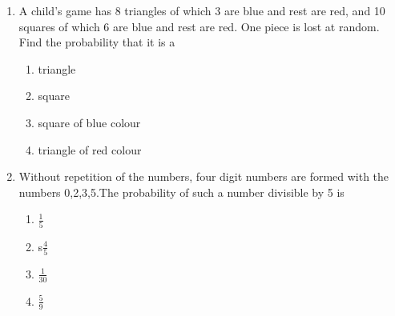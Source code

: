 \begin{enumerate}
\item A child's game has 8 triangles of which 3 are blue and rest are red, and 10 squares of which 6 are blue and rest are red. One piece is lost at random. Find the probability that it is a
\renewcommand{\labelenumi}{(\roman{enumi})}
\begin{enumerate}
\item triangle 
\item square 
\item square of blue colour 
\item triangle of red colour           
\end{enumerate}
\solution

\item Without repetition of the numbers, four digit numbers are formed with the numbers 0,2,3,5.The probability of such a number divisible by 5 is
\begin{enumerate}
\item $\frac{1}{5}$
\item s$\frac{4}{5}$
\item $\frac{1}{30}$
\item $\frac{5}{9}$          
\end{enumerate}
\solution

\end{enumerate}
